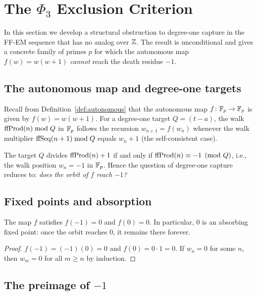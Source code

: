 \section{The \texorpdfstring{$\Phi_3$}{Phi3} Exclusion Criterion}\label{sec:phi3}

In this section we develop a structural obstruction to degree-one capture
in the FF-EM sequence that has no analog over $\mathbb{Z}$. The result is
unconditional and gives a concrete family of primes $p$ for which the
autonomous map $f(w) = w(w+1)$ \emph{cannot} reach the death residue $-1$.

\subsection{The autonomous map and degree-one targets}

Recall from Definition~\ref{def:autonomous} that the autonomous map
$f \colon \mathbb{F}_p \to \mathbb{F}_p$ is given by $f(w) = w(w+1)$. For a degree-one
target $Q = (t - a)$, the walk $\mathrm{ffProd}(n) \bmod Q$ in $\mathbb{F}_p$ follows
the recursion $w_{n+1} = f(w_n)$ whenever the walk multiplier
$\mathrm{ffSeq}(n+1) \bmod Q$ equals $w_n + 1$ (the self-consistent case).

The target $Q$ divides $\mathrm{ffProd}(n) + 1$ if and only if
$\mathrm{ffProd}(n) \equiv -1 \pmod{Q}$, i.e., the walk position $w_n = -1$
in $\mathbb{F}_p$. Hence the question of degree-one capture reduces to:
\emph{does the orbit of $f$ reach $-1$?}

\subsection{Fixed points and absorption}

\begin{lemma}\label{lem:absorption}
The map $f$ satisfies $f(-1) = 0$ and $f(0) = 0$. In particular, $0$ is
an absorbing fixed point: once the orbit reaches $0$, it remains there
forever.
\end{lemma}

\begin{proof}
$f(-1) = (-1)(0) = 0$ and $f(0) = 0 \cdot 1 = 0$. If $w_n = 0$ for
some $n$, then $w_m = 0$ for all $m \geq n$ by induction.
\end{proof}


\subsection{The preimage of \texorpdfstring{$-1$}{-1}}

